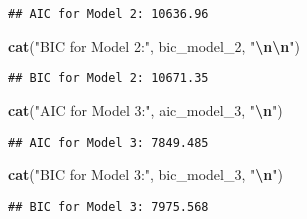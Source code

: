 \documentclass[
]{article}
\newenvironment{Shaded}{\begin{snugshade}}{\end{snugshade}}
\newcommand{\CommentTok}[1]{\textcolor[rgb]{0.56,0.35,0.01}{\textit{#1}}}
\newcommand{\ControlFlowTok}[1]{\textcolor[rgb]{0.13,0.29,0.53}{\textbf{#1}}}
\newcommand{\DecValTok}[1]{\textcolor[rgb]{0.00,0.00,0.81}{#1}}
\newcommand{\FunctionTok}[1]{\textcolor[rgb]{0.13,0.29,0.53}{\textbf{#1}}}
\newcommand{\NormalTok}[1]{#1}
\newcommand{\OtherTok}[1]{\textcolor[rgb]{0.56,0.35,0.01}{#1}}
\newcommand{\SpecialCharTok}[1]{\textcolor[rgb]{0.81,0.36,0.00}{\textbf{#1}}}
\newcommand{\StringTok}[1]{\textcolor[rgb]{0.31,0.60,0.02}{#1}}
\begin{document}
\begin{verbatim}
## AIC for Model 2: 10636.96
\end{verbatim}

\begin{Shaded}
\begin{Highlighting}[]
\FunctionTok{cat}\NormalTok{(}\StringTok{"BIC for Model 2:"}\NormalTok{, bic\_model\_2, }\StringTok{"}\SpecialCharTok{\textbackslash{}n\textbackslash{}n}\StringTok{"}\NormalTok{)}
\end{Highlighting}
\end{Shaded}

\begin{verbatim}
## BIC for Model 2: 10671.35
\end{verbatim}

\begin{Shaded}
\begin{Highlighting}[]
\FunctionTok{cat}\NormalTok{(}\StringTok{"AIC for Model 3:"}\NormalTok{, aic\_model\_3, }\StringTok{"}\SpecialCharTok{\textbackslash{}n}\StringTok{"}\NormalTok{)}
\end{Highlighting}
\end{Shaded}

\begin{verbatim}
## AIC for Model 3: 7849.485
\end{verbatim}

\begin{Shaded}
\begin{Highlighting}[]
\FunctionTok{cat}\NormalTok{(}\StringTok{"BIC for Model 3:"}\NormalTok{, bic\_model\_3, }\StringTok{"}\SpecialCharTok{\textbackslash{}n}\StringTok{"}\NormalTok{)}
\end{Highlighting}
\end{Shaded}

\begin{verbatim}
## BIC for Model 3: 7975.568
\end{verbatim}

\begin{Shaded}
\end{Shaded}
\end{document}

